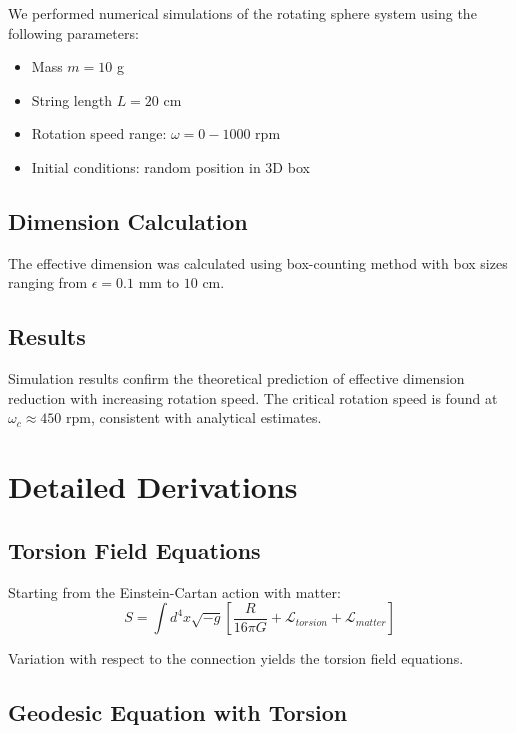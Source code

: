 \documentclass[UTF8]{ctex}\n\documentclass[12pt,a4paper]{article}
\begin{document}
We performed numerical simulations of the rotating sphere system using the following parameters:
\begin{itemize}
    \item Mass $m = 10$ g
    \item String length $L = 20$ cm
    \item Rotation speed range: $\omega = 0 - 1000$ rpm
    \item Initial conditions: random position in 3D box
\end{itemize}

\subsection{Dimension Calculation}

The effective dimension was calculated using box-counting method with box sizes ranging from $\epsilon = 0.1$ mm to $10$ cm.

\subsection{Results}

Simulation results confirm the theoretical prediction of effective dimension reduction with increasing rotation speed. The critical rotation speed is found at $\omega_c \approx 450$ rpm, consistent with analytical estimates.

\section{Detailed Derivations}
\label{app:derivations}

\subsection{Torsion Field Equations}

Starting from the Einstein-Cartan action with matter:
\begin{equation}
    S = \int d^4x \sqrt{-g} \left[\frac{R}{16\pi G} + \mathcal{L}_{torsion} + \mathcal{L}_{matter}\right]
\end{equation}

Variation with respect to the connection yields the torsion field equations.

\subsection{Geodesic Equation with Torsion}
\end{document}
